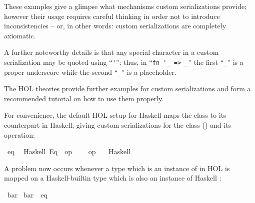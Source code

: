 \begin{isabellebody}
\begin{isamarkuptext}
  These examples give a glimpse what mechanisms
  custom serializations provide; however their usage
  requires careful thinking in order not to introduce
  inconsistencies -- or, in other words:
  custom serializations are completely axiomatic.

  A further noteworthy details is that any special
  character in a custom serialization may be quoted
  using ``\verb|'|''; thus, in
  ``\verb|fn '_ => _|'' the first
  ``\verb|_|'' is a proper underscore while the
  second ``\verb|_|'' is a placeholder.

  The HOL theories provide further
  examples for custom serializations and form
  a recommended tutorial on how to use them properly.%
\end{isamarkuptext}%
\isamarkuptrue%
%
\isamarkuptrue%
%
\begin{isamarkuptext}%
For convenience, the default
  HOL setup for Haskell maps the  class to
  its counterpart in Haskell, giving custom serializations
  for the class (\isa{{\isasymCODECLASS}}) and its operation:%
\end{isamarkuptext}%
\isamarkuptrue%
%
\isadelimtt
%
\endisadelimtt
%
\isatagtt
{}\isamarkupfalse%
\ eq\isanewline
\ \ {\isacharparenleft}Haskell\ {\isachardoublequoteopen}Eq{\isachardoublequoteclose}\ \ {\isachardoublequoteopen}op\ {\isacharequal}{\isachardoublequoteclose}\ {\isasymequiv}\ {\isachardoublequoteopen}{\isacharparenleft}{\isacharequal}{\isacharequal}{\isacharparenright}{\isachardoublequoteclose}{\isacharparenright}\isanewline
\isanewline
{}\isamarkupfalse%
\ {\isachardoublequoteopen}op\ {\isacharequal}{\isachardoublequoteclose}\isanewline
\ \ {\isacharparenleft}Haskell\ \ {}\ {\isachardoublequoteopen}{\isacharequal}{\isacharequal}{\isachardoublequoteclose}{\isacharparenright}%
\endisatagtt
{\isafoldtt}%
%
\isadelimtt
%
\endisadelimtt
%
\begin{isamarkuptext}%
A problem now occurs whenever a type which
  is an instance of  in HOL is mapped
  on a Haskell-builtin type which is also an instance
  of Haskell :%
\end{isamarkuptext}%
\isamarkuptrue%
\isamarkupfalse%
\ bar\isanewline
\isanewline
{}\isamarkupfalse%
\ bar\ {\isacharcolon}{\isacharcolon}\ eq%
\isadelimproof
\ %
\endisadelimproof
%
\isatagproof
\isacommand{{\isachardot}{\isachardot}}\isamarkupfalse%

\end{isabellebody}
